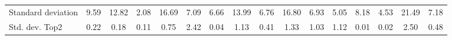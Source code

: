 \documentclass[sigconf,nonacm]{acmart}
\begin{document}
\begin{table*}[]
{\begin{tabular}{@{}l|ccccc|ccccc|ccccc@{}}
Standard deviation             & 9.59           & 12.82          & 2.08           & 16.69          & 7.09           & 6.66           & 13.99          & 6.76           & 16.80          & 6.93           & 5.05           & 8.18           & 4.53           & 21.49          & 7.18           \\
Std. dev. Top2        & 0.22           & 0.18           & 0.11           & 0.75           & 2.42           & 0.04           & 1.13           & 0.41           & 1.33           & 1.03           & 1.12           & 0.01           & 0.02           & 2.50           & 0.48           \\ \bottomrule
\end{tabular}}
\end{table*} \begin{table*}[]
\centering
\caption{Results of the few-shot and rule-based experiments in comparison to the best zero-shot prompt for all LLMs and datasets. The first block presents mean F1 scores over all datasets, while the following blocks contain F1 scores for individual datasets. Best result is bold, second best is underlined.}
\label{tab:few-shot-1}
\end{table*}
\end{document}
